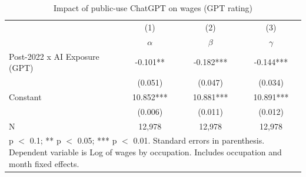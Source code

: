 \begin{table}[h]\centering
\def\sym#1{\ifmmode^{#1}\else\(^{#1}\)\fi}
\caption{Impact of public-use ChatGPT on wages (GPT rating) \label{tab:did_wages_gpt}}
\begin{tabular}{l*{3}{c}}
\hline\hline
                    &\multicolumn{1}{c}{(1)}&\multicolumn{1}{c}{(2)}&\multicolumn{1}{c}{(3)}\\
                    &\multicolumn{1}{c}{$\alpha$}&\multicolumn{1}{c}{$\beta$}&\multicolumn{1}{c}{$\gamma$}\\
\hline
Post-2022 x AI Exposure (GPT)&      -0.101** &      -0.182***&      -0.144***\\
                    &     (0.051)   &     (0.047)   &     (0.034)   \\
Constant            &      10.852***&      10.881***&      10.891***\\
                    &     (0.006)   &     (0.011)   &     (0.012)   \\
\hline
N                   &      12,978   &      12,978   &      12,978   \\
\hline\hline
\multicolumn{4}{p{0.7\linewidth}}{\footnotesize * p $<$ 0.1; ** p $<$ 0.05; *** p $<$ 0.01. Standard errors in parenthesis.          Dependent variable is Log of wages by occupation. Includes occupation and month fixed effects.}\\
\end{tabular}
\end{table}
